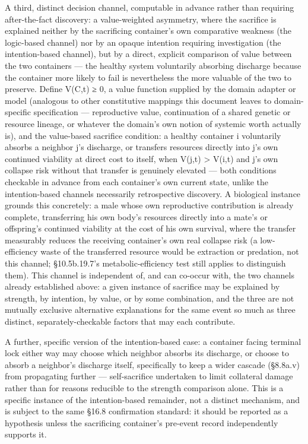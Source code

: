 \documentclass[
]{article}
\begin{document}
A third, distinct decision channel, computable in advance rather than
requiring after-the-fact discovery: a value-weighted asymmetry, where
the sacrifice is explained neither by the sacrificing container's own
comparative weakness (the logic-based channel) nor by an opaque
intention requiring investigation (the intention-based channel), but by
a direct, explicit comparison of value between the two containers ---
the healthy system voluntarily absorbing discharge because the container
more likely to fail is nevertheless the more valuable of the two to
preserve. Define V(C,t) ≥ 0, a value function supplied by the domain
adapter or model (analogous to other constitutive mappings this document
leaves to domain-specific specification --- reproductive value,
continuation of a shared genetic or resource lineage, or whatever the
domain's own notion of systemic worth actually is), and the value-based
sacrifice condition: a healthy container i voluntarily absorbs a
neighbor j's discharge, or transfers resources directly into j's own
continued viability at direct cost to itself, when V(j,t) \textgreater{}
V(i,t) and j's own collapse risk without that transfer is genuinely
elevated --- both conditions checkable in advance from each container's
own current state, unlike the intention-based channels necessarily
retrospective discovery. A biological instance grounds this concretely:
a male whose own reproductive contribution is already complete,
transferring his own body's resources directly into a mate's or
offspring's continued viability at the cost of his own survival, where
the transfer measurably reduces the receiving container's own real
collapse risk (a low-efficiency waste of the transferred resource would
be extraction or predation, not this channel; §10.5b.19.7's
metabolic-efficiency test still applies to distinguish them). This
channel is independent of, and can co-occur with, the two channels
already established above: a given instance of sacrifice may be
explained by strength, by intention, by value, or by some combination,
and the three are not mutually exclusive alternative explanations for
the same event so much as three distinct, separately-checkable factors
that may each contribute.

A further, specific version of the intention-based case: a container
facing terminal lock either way may choose which neighbor absorbs its
discharge, or choose to absorb a neighbor's discharge itself,
specifically to keep a wider cascade (§8.8a.v) from propagating further
--- self-sacrifice undertaken to limit collateral damage rather than for
reasons reducible to the strength comparison alone. This is a specific
instance of the intention-based remainder, not a distinct mechanism, and
is subject to the same §16.8 confirmation standard: it should be
reported as a hypothesis unless the sacrificing container's pre-event
record independently supports it.
\end{document}
